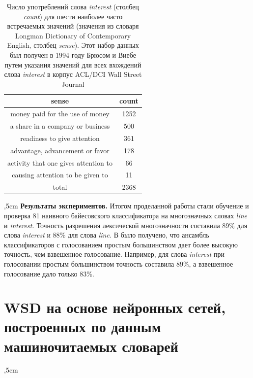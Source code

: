 \documentclass{article}
\begin{document}
\begin{articletext}
\begin{table}[H]
\centering
\caption{Число употреблений слова \textit{interest} (столбец \textit{count}) для шести наиболее часто встречаемых значений (значения из словаря Longman Dictionary of Contemporary English, столбец \textit{sense}). Этот набор данных был получен в 1994 году Брюсом и Виебе \cite{Bruce 1994} путем указания значений для всех вхождений слова \textit{interest} в корпус ACL/DCI Wall Street Journal}
\begin{tabular}{|c|c|}
\hline
sense & count\\
\hline
money paid for the use of money & 1252\\
a share in a company or business & 500\\
readiness to give attention & 361\\
advantage, advancement or favor & 178\\
activity that one gives attention to & 66\\
causing attention to be given to & 11\\
\hline
total & 2368\\
\hline
\end{tabular}
\label{tbl4}
\end{table}


,5cm
\textbf{Результаты экспериментов.} Итогом проделанной работы стали обучение и проверка 81 наивного байесовского классификатора на многозначных словах \textit{line} и \textit{interest.} Точность разрешения лексической многозначности составила 89\% для слова \textit{interest} и 88\% для слова \textit{line.} В \cite{Pedersen 2000} было получено, что ансамбль классификаторов с голосованием простым большинством дает более высокую точность, чем взвешенное голосование. Например, для слова \textit{interest} при голосовании простым большинством точность составила 89\%, а взвешенное голосование дало только 83\%.




\section{WSD на основе нейронных сетей, построенных по данным машиночитаемых словарей}

\begin{flushright}
\end{flushright}

,5cm


\end{articletext}
\end{document}
